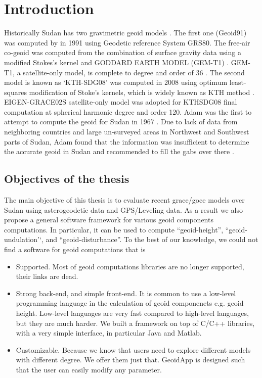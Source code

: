 \chapter{Introduction}

Historically Sudan has two gravimetric geoid models \cite{ahmed_similar_paper}. The first one (Geoid91) was computed by \cite{fashir} in 1991 using Geodetic reference System GRS80. The free-air co-geoid was computed from the combination of surface gravity data using a modified Stokes's kernel and GODDARD EARTH MODEL (GEM-T1)  \cite{fashir}. GEM-T1, a satellite-only model, is complete to degree and order of 36 \cite{nasa}. The second model is known as `KTH-SDG08' was computed in 2008 using optimum least-squares modification of Stoke's kernels, which is widely known as KTH method \cite{ahmed_msc}. EIGEN-GRACE02S
satellite-only model was adopted for KTHSDG08 final computation at spherical harmonic degree and order 120. Adam was the first to attempt to compute the geoid for Sudan in 1967 \cite{adam}. Due to lack of data from neighboring countries and large un-surveyed areas in Northwest and Southwest parts of Sudan, Adam found that the information was insufficient to determine the accurate geoid in Sudan and recommended to fill the gabs over there \cite{ahmed_msc}. 


\section{Objectives of the thesis}
The main objective of this thesis is to evaluate recent grace/goce models over Sudan using asterogeodetic data and GPS/Leveling data. As a result we also propose a general software framework for various geoid components computations. In particular, it can be used to compute ``geoid-height'', ``geoid-undulation'`, and ``geoid-disturbance''. To the best of our knowledge, we could not find a software for geoid computations that is
\begin{itemize}
	\item {Supported}. Most of geoid computations libraries are no longer supported, their links are dead.
	\item {Strong back-end, and simple front-end}. It is common to use a low-level programming language in the calculation of geoid componenets e.g. geoid height. Low-level languages are very fast compared to high-level languages, but they are much harder. We built a framework on top of C/C++ libraries, with a very simple interface, in particular Java and Matlab.
	\item {Customizable}. Because we know that users need to explore different models with different degree. We offer them just that. GeoidApp is designed such that the user can easily modify any parameter.
\end{itemize}

